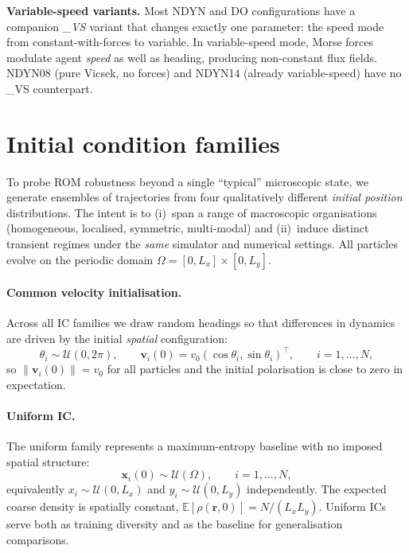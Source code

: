 \noindent\textbf{Variable-speed variants.}
\label{subsec:vs_variants}
Most NDYN and DO configurations have a companion \emph{\_VS} variant
that changes exactly one parameter:
the speed mode from constant-with-forces to variable.  In
variable-speed mode, Morse forces modulate agent \emph{speed} as well as
heading, producing non-constant flux fields.  NDYN08 (pure Vicsek, no forces)
and NDYN14 (already variable-speed) have no \_VS counterpart.

\section{Initial condition families}
\label{sec:ic_families}

To probe ROM robustness beyond a single ``typical'' microscopic state, we
generate ensembles of trajectories from four qualitatively different
\emph{initial position} distributions.  The intent is to
(i)~span a range of macroscopic organisations (homogeneous, localised,
symmetric, multi-modal) and (ii)~induce distinct transient regimes under the
\emph{same} simulator and numerical settings.  All particles evolve on the
periodic domain $\Omega=[0,L_x]\times[0,L_y]$.

\paragraph{Common velocity initialisation.}
Across all IC families we draw random headings so that differences in dynamics
are driven by the initial \emph{spatial} configuration:
\begin{equation}
  \theta_i \sim \mathcal{U}(0,2\pi),\qquad
  \mathbf{v}_i(0)=v_0(\cos\theta_i,\sin\theta_i)^\top,\qquad i=1,\dots,N,
  \label{eq:ic_vel_init}
\end{equation}
so $\|\mathbf{v}_i(0)\|=v_0$ for all particles and the initial polarisation is
close to zero in expectation.

\paragraph{Uniform IC.}
\label{subsec:ic_uniform}
The uniform family represents a maximum-entropy
baseline with no imposed spatial structure:
\begin{equation}
  \mathbf{x}_i(0)\sim \mathcal{U}(\Omega), \qquad i=1,\dots,N,
  \label{eq:ic_uniform_def}
\end{equation}
equivalently $x_i\sim\mathcal{U}(0,L_x)$ and $y_i\sim\mathcal{U}(0,L_y)$
independently.  The expected coarse density is spatially constant,
$\mathbb{E}[\rho(\mathbf{r},0)] = N/(L_xL_y)$.  Uniform ICs serve both as
training diversity and as the baseline for generalisation comparisons.


